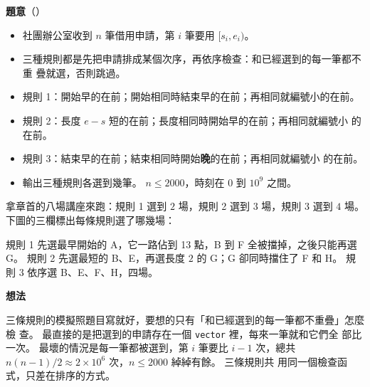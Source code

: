 \textbf{題意}（）

\begin{itemize}
\item 社團辦公室收到 $n$ 筆借用申請，第 $i$ 筆要用 $[s_i, e_i)$。
\item 三種規則都是先把申請排成某個次序，再依序檢查：和已經選到的每一筆都不重
疊就選，否則跳過。
\item 規則 1：開始早的在前；開始相同時結束早的在前；再相同就編號小的在前。
\item 規則 2：長度 $e - s$ 短的在前；長度相同時開始早的在前；再相同就編號小
的在前。
\item 規則 3：結束早的在前；結束相同時開始\textbf{晚}的在前；再相同就編號小
的在前。
\item 輸出三種規則各選到幾筆。 $n \le 2000$，時刻在 $0$ 到 $10^9$ 之間。
\end{itemize}

拿章首的八場講座來跑：規則 1 選到 $2$ 場，規則 2 選到 $3$ 場，規則 3 選到
$4$ 場。 下圖的三欄標出每條規則選了哪幾場：

\begin{center}
\label{fig:talk-rules}
\end{center}

規則 1 先選最早開始的 A，它一路佔到 13 點，B 到 F 全被擋掉，之後只能再選 G。
規則 2 先選最短的 B、E，再選長度 $2$ 的 G；G 卻同時擋住了 F 和 H。 規則 3
依序選 B、E、F、H，四場。

\textbf{想法}

三條規則的模擬照題目寫就好，要想的只有「和已經選到的每一筆都不重疊」怎麼檢
查。 最直接的是把選到的申請存在一個 \texttt{vector} 裡，每來一筆就和它們全
部比一次。 最壞的情況是每一筆都被選到，第 $i$ 筆要比 $i - 1$ 次，總共
$n(n - 1)/2 \approx 2 \times 10^6$ 次，$n \le 2000$ 綽綽有餘。 三條規則共
用同一個檢查函式，只差在排序的方式。

